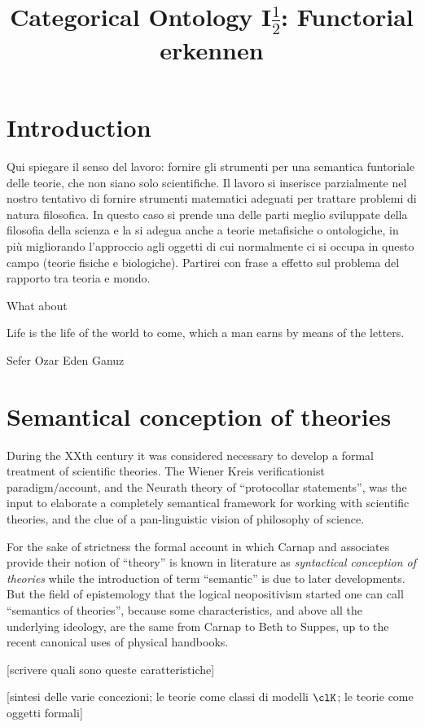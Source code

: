\documentclass[a4paper]{../birkjour}
\title{Categorical Ontology I$\frac{1}{2}$: Functorial erkennen}
\begin{document}
\maketitle
\tableofcontents

\section{Introduction}
Qui spiegare il senso del lavoro: fornire gli strumenti per una semantica funtoriale delle teorie, che non siano solo scientifiche. Il lavoro si inserisce parzialmente nel nostro tentativo di fornire strumenti matematici adeguati per trattare problemi di natura filosofica. In questo caso si prende una delle parti meglio sviluppate della filosofia della scienza e la si adegua anche a teorie metafisiche o ontologiche, in più migliorando l'approccio agli oggetti di cui normalmente ci si occupa in questo campo (teorie fisiche e biologiche). Partirei con frase a effetto sul problema del rapporto tra teoria e mondo.

What about 

\epigraph{Life is the life of the world to come, which a man earns by means of the letters.}{Sefer Ozar Eden Ganuz}

\section{Semantical conception of theories}
During the XXth century it was considered necessary to develop a formal treatment of scientific theories. The Wiener Kreis verificationist paradigm/account, and the Neurath theory of ``protocollar statements'', was the input to elaborate a completely semantical framework for working with scientific theories, and the clue of a pan-linguistic vision of philosophy of science. 

For the sake of strictness the formal account in which Carnap and associates provide their notion of ``theory'' is known in literature as \emph{syntactical conception of theories} \cite{.} while the introduction of term ``semantic'' is due to later developments. But the field of epistemology that the logical neopositivism started one can call ``semantics of theories'', because some characteristics, and above all the underlying ideology, are the same from Carnap to Beth to Suppes, up to the recent canonical uses of physical handbooks. 

[scrivere quali sono queste caratteristiche]

[sintesi delle varie concezioni; le teorie come classi di modelli $\clK$; 
le teorie come oggetti formali]
\end{document}
